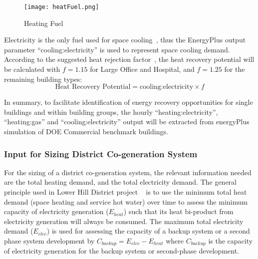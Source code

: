 \begin{figure}[h!]
  \centering
  \texttt{[image: heatFuel.png]}
  \caption[Heating Fuel]{Heating Fuel}
  \label{fig:heatFuel}
\end{figure}
Electricity is the only fuel used for space cooling~\cite{DOE2015},
thus the EnergyPlus output parameter ``cooling:electricity'' is used
to represent space cooling demand. According to the suggested heat
rejection factor~\cite{Bhatia2015}, the heat recovery potential will
be calculated with $f = 1.15$ for Large Office and Hospital, and
$f = 1.25$ for the remaining building types:
\begin{equation}\label{eq:recover}
\text{Heat Recovery Potential} = \text{cooling:electricity} \times f
\end{equation}

In summary, to facilitate identification of energy recovery
opportunities for single buildings and within building groups, the
hourly ``heating:electricity'', ``heating:gas'' and
``cooling:electricity'' output will be extracted from energyPlus
simulation of DOE Commercial benchmark buildings.

\subsubsection{Input for Sizing District Co-generation
  System}
For the sizing of a district co-generation system, the relevant
information needed are the total heating demand, and the total
electricity demand. The general principle used in Lower Hill District
project ~\cite{baird2014} is to use the minimum total heat demand
(space heating and service hot water) over time to assess the minimum
capacity of electricity generation ($E_{heat}$) such that its heat
bi-product from electricity generation will always be consumed. The
maximum total electricity demand ($E_{elec}$) is used for assessing
the capacity of a backup system or a second phase system development
by $C_{backup} = E_{elec} - E_{heat}$ where $C_{backup}$ is the
capacity of electricity generation for the backup system or
second-phase development.

